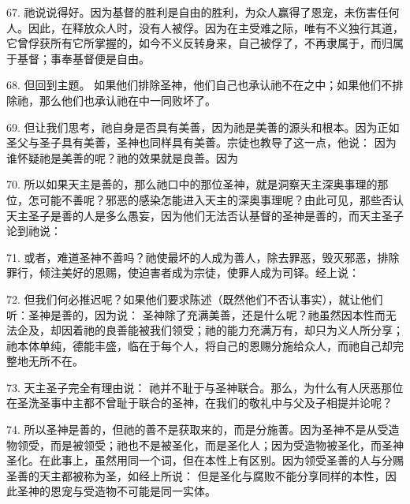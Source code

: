 67. 祂说说得好。因为基督的胜利是自由的胜利，为众人赢得了恩宠，未伤害任何人。因此，在释放众人时，没有人被俘。因为在主受难之际，唯有不义独行其道，它曾俘获所有它所掌握的，如今不义反转身来，自己被俘了，不再隶属于，而归属于基督；事奉基督便是自由。\par

68. 但回到主题。 如果他们排除圣神，他们自己也承认祂不在之中；如果他们不排除祂，那么他们也承认祂在中一同败坏了。\par

69. 但让我们思考，祂自身是否具有美善，因为祂是美善的源头和根本。因为正如圣父与圣子具有美善，圣神也同样具有美善。宗徒也教导了这一点，他说： 因为谁怀疑祂是美善的呢？祂的效果就是良善。因为\par

70. 所以如果天主是善的，那么祂口中的那位圣神，就是洞察天主深奥事理的那位，怎可能不善呢？邪恶的感染怎能进入天主的深奥事理呢？由此可见，那些否认天主圣子是善的人是多么愚妄，因为他们无法否认基督的圣神是善的，而天主圣子论到祂说：\par

71. 或者，难道圣神不善吗？祂使最坏的人成为善人，除去罪恶，毁灭邪恶，排除罪行，倾注美好的恩赐，使迫害者成为宗徒，使罪人成为司铎。经上说：\par

72. 但我们何必推迟呢？如果他们要求陈述（既然他们不否认事实），就让他们听：圣神是善的，因为说： 圣神除了充满美善，还是什么呢？祂虽然因本性而无法企及，却因着祂的良善能被我们领受；祂的能力充满万有，却只为义人所分享；祂本体单纯，德能丰盛，临在于每个人，将自己的恩赐分施给众人，而祂自己却完整地无所不在。\par

73. 天主圣子完全有理由说： 祂并不耻于与圣神联合。那么，为什么有人厌恶那位在圣洗圣事中主都不曾耻于联合的圣神，在我们的敬礼中与父及子相提并论呢？\par

74. 所以圣神是善的，但祂的善不是获取来的，而是分施善。因为圣神不是从受造物领受，而是被领受；祂也不是被圣化，而是圣化人；因为受造物被圣化，而圣神圣化。在此事上，虽然用同一个词，但在本性上有区别。因为领受圣善的人与分赐圣善的天主都被称为圣，如经上所说： 但是圣化与腐败不能分享同样的本性，因此圣神的恩宠与受造物不可能是同一实体。\par

